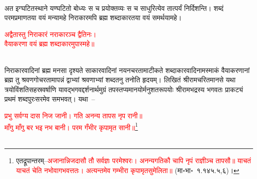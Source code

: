 \\
\begin{sloppypar}\justifying\noindent अत इग्घटित\-स्थाने यण्घटितो बोध्यः स च प्रयोक्तव्यः स च साधुरित्येव तात्पर्यं निर्दिशन्ति। शब्दं परम\-प्रमाणतया वयं मन्यामहे निराकारमपि ब्रह्म शब्दाकारतया वयं समर्थयामहे।\end{sloppypar}
\centering\textcolor{red}{अद्वैतास्तु निराकारं नराकारञ्च द्वैतिनः।\nopagebreak\\
वैयाकरणा वयं ब्रह्म शब्दाकारमुपास्महे॥}\nopagebreak\\
\\
\begin{sloppypar}\justifying\noindent निराकार\-वादिनां ब्रह्म मनसा दृश्यते साकार\-वादिनां नयन\-चरतामाटीकते शब्दाकार\-वादिनामस्माकं वैयाकरणानां ब्रह्म तु श्रवण\-गोचरतामापन्नं द्वाभ्यां श्रवणाभ्यां शब्दतनु तनोति हृदयम्। लिखितं श्रीराम\-चरित\-मानसे यथा त्रयोविंशति\-सहस्र\-वर्षाणि यावद्भगवद्दर्शनार्थमुग्रं तपस्तप्य\-मानयोर्मनु\-शतरूपयोः श्रीरामभद्रस्य भगवतः प्राकट्यं प्रथमं शब्द\-पुरःसरमेव समभवत्। यथा~–\end{sloppypar}
\centering\textcolor{red}{प्रभु सर्वग्य दास निज जानी। गति अनन्य तापस नृप रानी॥\nopagebreak\\
माँगु माँगु बर भइ नभ बानी। परम गँभीर कृपामृत सानी॥}\footnote{एतद्रूपान्तरम्–\textcolor{red}{अजानान्निजदासौ तौ सर्वज्ञः परमेश्वरः। अनन्यगतिकौ चापि नृपं राज्ञीञ्च तापसौ॥ याचतं याचतं चेति नभोवागभवत्ततः। अत्यन्तमेव गम्भीरा कृपामृतसुमेलिता॥} (मा॰भा॰~१.१४५.५,६)।}
\nopagebreak\\
\\
